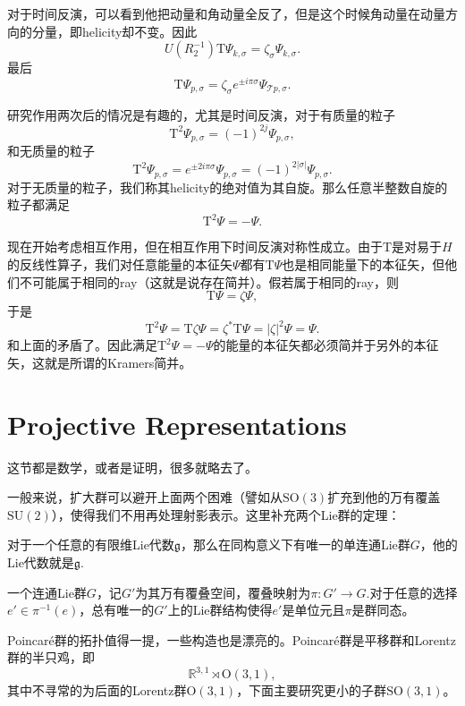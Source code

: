 对于时间反演，可以看到他把动量和角动量全反了，但是这个时候角动量在动量方向的分量，即helicity却不变。因此
\[
U(R_2^{-1})\mathrm{T}\Psi_{k,\sigma}=\zeta_{\sigma}\Psi_{k,\sigma}.
\]
最后
\[
\mathrm{T}\Psi_{p,\sigma}=\zeta_{\sigma}e^{\pm i\pi\sigma}\Psi_{\mathscr{T}p,\sigma}.
\]

研究作用两次后的情况是有趣的，尤其是时间反演，对于有质量的粒子
\[
\mathrm{T}^2\Psi_{p,\sigma}=(-1)^{2j}\Psi_{p,\sigma},
\]
和无质量的粒子
\[
\mathrm{T}^2\Psi_{p,\sigma}=e^{\pm 2i\pi\sigma}\Psi_{p,\sigma}=(-1)^{2|\sigma|}\Psi_{p,\sigma}.
\]
对于无质量的粒子，我们称其helicity的绝对值为其自旋。那么任意半整数自旋的粒子都满足
\[
\mathrm{T}^2\Psi=-\Psi.
\]

现在开始考虑相互作用，但在相互作用下时间反演对称性成立。由于$\mathrm{T}$是对易于$H$的反线性算子，我们对任意能量的本征矢$\Psi$都有$\mathrm{T}\Psi$也是相同能量下的本征矢，但他们不可能属于相同的ray（这就是说存在简并）。假若属于相同的ray，则
\[
\mathrm{T}\Psi=\zeta\Psi,
\]
于是
\[
\mathrm{T}^2\Psi=\mathrm{T}\zeta\Psi=\zeta^*\mathrm{T}\Psi=|\zeta|^2\Psi=\Psi.
\]
和上面的矛盾了。因此满足$\mathrm{T}^2\Psi=-\Psi$的能量的本征矢都必须简并于另外的本征矢，这就是所谓的Kramers简并。
\section{Projective Representations}
这节都是数学，或者是证明，很多就略去了。

一般来说，扩大群可以避开上面两个困难（譬如从$\mathrm{SO}(3)$扩充到他的万有覆盖$\mathrm{SU}(2)$），使得我们不用再处理射影表示。这里补充两个Lie群的定理：
\begin{theo}
对于一个任意的有限维Lie代数$\mathfrak{g}$，那么在同构意义下有唯一的单连通Lie群$G$，他的Lie代数就是$\mathfrak{g}$.
\end{theo}
\begin{theo}
一个连通Lie群$G$，记$G'$为其万有覆叠空间，覆叠映射为$\pi:G'\to G$.对于任意的选择$e'\in \pi^{-1}(e)$，总有唯一的$G'$上的Lie群结构使得$e'$是单位元且$\pi$是群同态。
\end{theo}
Poincar\'{e}群的拓扑值得一提，一些构造也是漂亮的。Poincar\'{e}群是平移群和Lorentz群的半只鸡，即
\[
\mathbb{R}^{3,1} \rtimes \mathrm{O}(3,1),
\]
其中不寻常的为后面的Lorentz群$\mathrm{O}(3,1)$，下面主要研究更小的子群$\mathrm{SO}(3,1)$。

